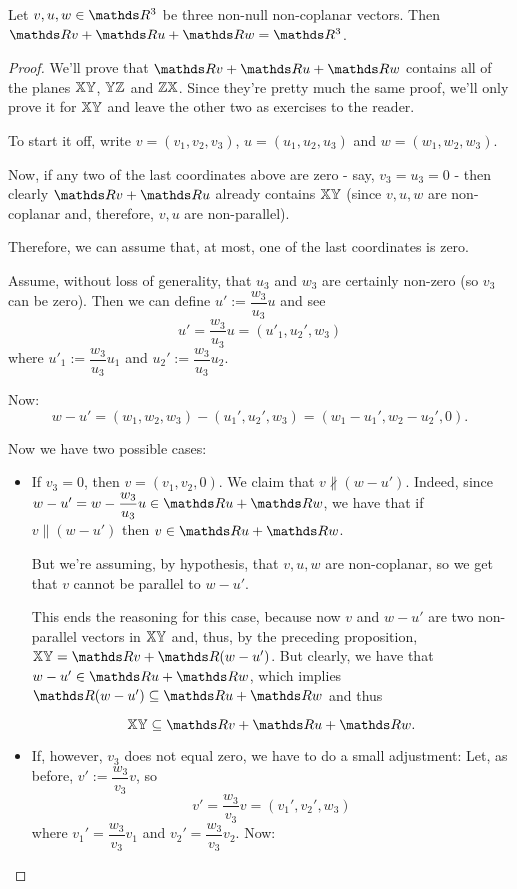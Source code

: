 \begin{cor}
	Let $v,u,w\in\R^3$ be three non-null non-coplanar vectors. Then $\R v+\R u+\R w=\R^3$.
\end{cor}
\begin{proof}
	We'll prove that $\R v+\R u+\R w$ contains all of the planes $\mathbb{XY}$, $\mathbb{YZ}$ and $\mathbb{ZX}$. Since they're pretty much the same proof, we'll only prove it for $\mathbb{XY}$ and leave the other two as exercises to the reader.
	
	To start it off, write $v=(v_1,v_2,v_3)$, $u=(u_1,u_2,u_3)$ and $w=(w_1,w_2,w_3)$.
	
	Now, if any two of the last coordinates above are zero - say, $v_3=u_3=0$ - then clearly $\R v+\R u$ already contains $\mathbb{XY}$ (since $v,u,w$ are non-coplanar and, therefore, $v,u$ are non-parallel).
	
	Therefore, we can assume that, at most, one of the last coordinates is zero.
	
	Assume, without loss of generality, that $u_3$ and $w_3$ are certainly non-zero (so $v_3$ can be zero). Then we can define $u':=\dfrac{w_3}{u_3}u$ and see
	\[u'=\dfrac{w_3}{u_3}u=(u'_1,u_2',w_3)\]where $u'_1:=\dfrac{w_3}{u_3}u_1$ and $u_2':=\dfrac{w_3}{u_3}u_2$.
	
	Now:
	\[w-u'=(w_1,w_2,w_3)-(u_1',u_2',w_3)=(w_1-u_1',w_2-u_2',0).\]
	
	Now we have two possible cases:
	\begin{itemize}
		\item If $v_3=0$, then $v=(v_1,v_2,0)$. We claim that $v\nparallel (w-u')$. Indeed, since $w-u'=w-\dfrac{w_3}{u_3}u\in \R u+\R w$, we have that if $v\parallel (w-u')$ then $v\in \R u+\R w$.
		
		But we're assuming, by hypothesis, that $v,u,w$ are non-coplanar, so we get that $v$ cannot be parallel to $w-u'$.
		
		This ends the reasoning for this case, because now $v$ and $w-u'$ are two non-parallel vectors in $\mathbb{XY}$ and, thus, by the preceding proposition, $\mb{XY}=\R v+\R(w-u')$. But clearly, we have that $w-u'\in \R u+\R w$, which implies $\R(w-u')\subseteq \R u+\R w$ and thus
		
		\[\mb{XY}\subseteq\R v+\R u+\R w.\]
		
		\item If, however, $v_3$ does not equal zero, we have to do a small adjustment: Let, as before, $v':=\dfrac{w_3}{v_3}v$, so
		\[v'=\frac{w_3}{v_3}v=(v_1',v_2',w_3)\]where $v_1'=\dfrac{w_3}{v_3}v_1$ and $v_2'=\dfrac{w_3}{v_3}v_2$. Now:
		

\end{itemize}
\end{proof}

